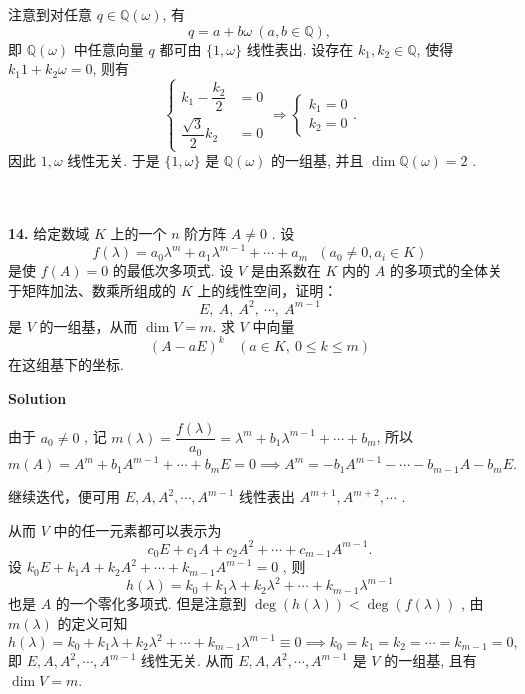 \documentclass[11pt,a4paper,openany,oneside]{book}
\newcommand\Solution{\noindent\textbf{\textsf{Solution}}\par\medskip}
\begin{document}
注意到对任意 $q \in \mathbb{Q}(\omega)$, 有
\[ 
q = a + b \omega\ (a, b \in \mathbb{Q}), 
\]
即 $ \mathbb{Q}(\omega) $ 中任意向量 $ q $ 都可由 $ \{1, \omega\} $ 线性表出.  
设存在 $ k_1, k_2 \in \mathbb{Q} $, 使得 $ k_1 1 + k_2\omega = 0 $, 则有
\begin{equation*}
\left\{
\begin{aligned}
k_1 - \dfrac{k_2}{2} &= 0 \\
\dfrac{\sqrt{3}}{2}k_2 &= 0 
\end{aligned}
\right.   \Longrightarrow 
\left\{
\begin{aligned}
k_1 = 0  \\
k_2 = 0
\end{aligned}
\right.
.
\end{equation*}
因此 $ 1, \omega $ 线性无关. 于是 $ \{1, \omega\} $ 是 $ \mathbb{Q}(\omega) $ 的一组基, 并且 $ \dim  \mathbb{Q}(\omega) = 2 $ . \\  \\  \\



\hypertarget{4.1.14}{}
\begin{myexample}
\textbf{14.} 
给定数域 $ K $  上的一个 $ n $ 阶方阵 $ A \neq 0 $ . 设
 $$  f(\lambda) = a_0\lambda^m + a_1\lambda^{m-1} + \cdots + a_m \ \ \ (a_0 \neq 0, a_i \in K)  $$ 
是使 $ f(A) = 0 $ 的最低次多项式. 设 $ V $ 是由系数在 $ K $ 内的 $ A $ 的多项式的全体关于矩阵加法、数乘所组成的 $ K $ 上的线性空间，证明：
\vspace{-1em}
 $$  E,\ A,\ A^2,\ \cdots,\ A^{m-1}   $$ 
是 $ V $ 的一组基，从而 $ \dim V = m $. 求 $ V $ 中向量
\vspace{-1em}
 $$  (A - aE)^k  \ \ \ \ (a \in K, \ 0 \leq k \leq m) $$ 
在这组基下的坐标. 
\end{myexample}
\Solution

由于 $ a_0 \neq 0 $ , 记 $ m(\lambda) =\dfrac{f(\lambda)}{a_0} = \lambda^m + b_1\lambda^{m-1} + \cdots + b_m $, 所以
 $$ m(A) = A^m + b_1A^{m-1} + \cdots + b_mE=0\implies A^m = -b_1A^{m-1} - \cdots - b_{m-1}A - b_mE.$$ 

继续迭代，便可用 $ E, A, A^2, \cdots, A^{m-1} $ 线性表出 $ A^{m+1}, A^{m+2}, \cdots $ .

从而 $ V $ 中的任一元素都可以表示为
 $$  c_0E + c_1A + c_2 A^2 + \cdots + c_{m-1}A^{m-1}.$$ 
设 $ k_0E + k_1A + k_2 A^2 + \cdots + k_{m-1} A^{m-1} = 0 $ , 则
 $$  h(\lambda) = k_0 + k_1\lambda + k_2\lambda^2 + \cdots + k_{m-1}\lambda^{m-1}  $$ 
也是 $ A $ 的一个零化多项式. 但是注意到 $ \deg(h(\lambda)) < \deg(f(\lambda)) $ , 由 $ m(\lambda) $ 的定义可知
 $$  h(\lambda) = k_0 + k_1\lambda + k_2\lambda^2 + \cdots + k_{m-1}\lambda^{m-1} \equiv 0\implies k_0 = k_1 = k_2 = \cdots = k_{m-1} = 0,$$ 
即 $ E, A, A^2, \cdots, A^{m-1} $ 线性无关. 从而 $ E, A, A^2, \cdots, A^{m-1} $ 是 $ V $ 的一组基, 且有 $ \dim  V = m $.
\end{document}
